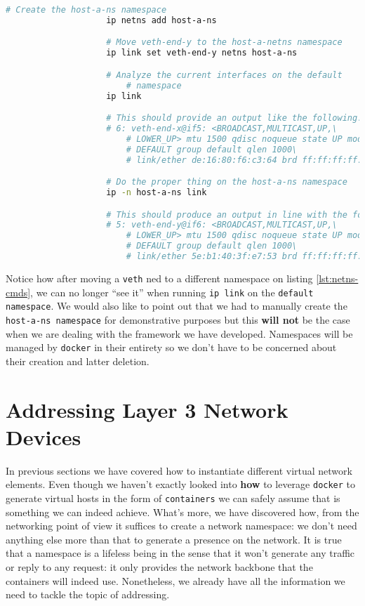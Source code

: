                 \begin{lstlisting}[language = bash, caption = Running \texttt{ip} on a different namespace., label = lst:netns-cmds]
                    # Create the host-a-ns namespace
                    ip netns add host-a-ns

                    # Move veth-end-y to the host-a-netns namespace
                    ip link set veth-end-y netns host-a-ns

                    # Analyze the current interfaces on the default
                        # namespace
                    ip link

                    # This should provide an output like the following:
                    # 6: veth-end-x@if5: <BROADCAST,MULTICAST,UP,\
                        # LOWER_UP> mtu 1500 qdisc noqueue state UP mode\
                        # DEFAULT group default qlen 1000\
                        # link/ether de:16:80:f6:c3:64 brd ff:ff:ff:ff:ff:ff

                    # Do the proper thing on the host-a-ns namespace
                    ip -n host-a-ns link

                    # This should produce an output in line with the following:
                    # 5: veth-end-y@if6: <BROADCAST,MULTICAST,UP,\
                        # LOWER_UP> mtu 1500 qdisc noqueue state UP mode\
                        # DEFAULT group default qlen 1000\
                        # link/ether 5e:b1:40:3f:e7:53 brd ff:ff:ff:ff:ff:ff
                \end{lstlisting}

                Notice how after moving a \texttt{veth} ned to a different namespace on listing \ref{lst:netns-cmds}, we can no longer ``see it'' when running \texttt{ip link} on the \texttt{default namespace}. We would also like to point out that we had to manually create the \texttt{host-a-ns namespace} for demonstrative purposes but this \textbf{will not} be the case when we are dealing with the framework we have developed. Namespaces will be managed by \texttt{docker} in their entirety so we don't have to be concerned about their creation and latter deletion.\\

    \section{Addressing Layer 3 Network Devices}
        In previous sections we have covered how to instantiate different virtual network elements. Even though we haven't exactly looked into \textbf{how} to leverage \texttt{docker} to generate virtual hosts in the form of \texttt{containers} we can safely assume that is something we can indeed achieve. What's more, we have discovered how, from the networking point of view it suffices to create a network namespace: we don't need anything else more than that to generate a presence on the network. It is true that a namespace is a lifeless being in the sense that it won't generate any traffic or reply to any request: it only provides the network backbone that the containers will indeed use. Nonetheless, we already have all the information we need to tackle the topic of addressing.\\

